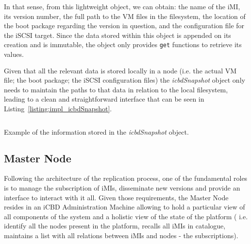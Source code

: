 In that sense, from this lightweight object, we can obtain: the name of the iMI, its version number, the full path to the VM files in the filesystem, the location of the boot package regarding the version in question, and the configuration file for the iSCSI target. Since the data stored within this object is appended on its creation and is immutable, the object only provides \texttt{get} functions to retrieve its values.

Given that all the relevant data is stored locally in a node (i.e. the actual VM file; the boot package; the iSCSI configuration files) the \textit{icbdSnapshot} object only needs to maintain the paths to that data in relation to the local filesystem, leading to a clean and straightforward interface that can be seen in Listing~\ref{listing:impl_icbdSnapshot}.

\begin{listing}[ht]
\inputminted{python}{./Chapters/Code/cap4_icbdSnapshot.py}
\caption{Example of the information stored in the \textit{icbdSnapshot} object.}
\label{listing:impl_icbdSnapshot}
\end{listing}



\subsection{Master Node}
\label{sub:impl_icbdrep_master_node}


Following the architecture of the replication process, one of the fundamental roles is to manage the subscription of iMIs, disseminate new versions and provide an interface to interact with it all. Given those requirements, the Master Node resides in an iCBD Administration Machine allowing to hold a particular view of all components of the system and a holistic view of the state of the platform ( i.e. identify all the nodes present in the platform, recalls all iMIs in catalogue, maintains a list with all relations between iMIs and nodes - the subscriptions). 

